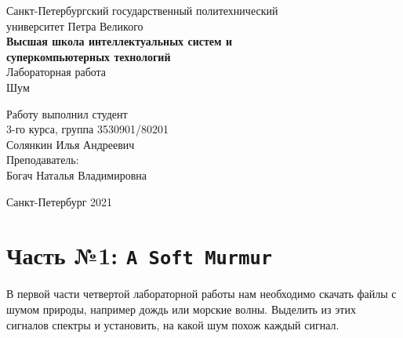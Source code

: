\documentclass[a4paper]{article}
\begin{document}
    \begin{center}
        \begin{center}
        \hfill \break
        \normalsize{Санкт-Петербургский государственный политехнический}\\
        \normalsize{университет Петра Великого}\\
        \hfill \break
        \normalsize{\textbf{Высшая школа интеллектуальных систем и}}\\ 
        \normalsize{\textbf{суперкомпьютерных технологий}}\\ 
        \hfill \break
        \hfill \break
        \hfill \break
        \normalsize{Лабораторная работа}\\
        \hfill \break
        \hfill \break
        \normalsize{\LARGE Шум}\\
        \end{center}
        \hfill \break
        \hfill \break
        \hfill \break
        \hfill \break
        \hfill \break
        \hfill \break
        \hfill \break
        \hfill \break
        \hfill \break
        \hfill \break
        \begin{flushright}
            \normalsize{Работу выполнил студент}\\
            \normalsize{3-го курса, группа 3530901/80201}\\
            \normalsize{Солянкин Илья Андреевич}\\
            \hfill \break
            \normalsize{Преподаватель:}\\
            \normalsize{Богач Наталья Владимировна}\\
        \end{flushright}
        \hfill \break
        \hfill \break
        \hfill \break
        \hfill \break
        \begin{center} Санкт-Петербург 2021 \end{center}
        \thispagestyle{empty}
    \end{center}
    
    \newpage
        \tableofcontents
    
    \newpage
         \listoffigures
    
    \newpage
         \lstlistoflistings   
     
    \newpage
        \section{Часть №1: \texttt{A Soft Murmur}}
            В первой части четвертой лабораторной работы нам необходимо скачать файлы с шумом природы, например дождь или морские волны. Выделить из этих сигналов спектры и установить, на какой шум похож каждый сигнал.
            
\end{document}
